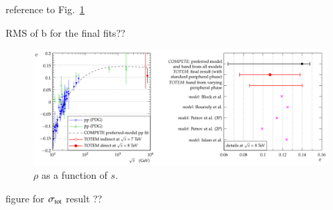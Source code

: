 \> reference to Fig.~\ref{fig:rho_s}

\> RMS of b for the final fits??

\begin{figure}
\begin{center}
\includegraphics[width=16cm]{fig/rho_s.pdf}
\vskip-3mm
\caption{$\rho$ as a function of $s$.}
\label{fig:rho_s}
\end{center}
\end{figure}

\> figure for $\sigma_{\rm tot}$ result ??
